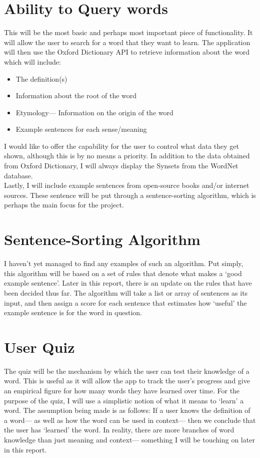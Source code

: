 \section{Ability to Query words}

This will be the most basic and perhaps most important piece of functionality. It will allow the user to search for a word that they want to learn. The application will then use the Oxford Dictionary API to retrieve information about the word which will include:
\begin{itemize}
    \item The definition(s)
    \item Information about the root of the word
    \item Etymology--- Information on the origin of the word
    \item Example sentences for each sense/meaning
\end{itemize}

I would like to offer the capability for the user to control what data they get shown, although this is by no means a priority. In addition to the data obtained from Oxford Dictionary, I will always display the Synsets from the WordNet\textsuperscript{\textregistered} database. 
\\
Lastly, I will include example sentences from open-source books and/or internet sources. These sentence will be put through a sentence-sorting algorithm, which is perhaps the main focus for the project. 

\section{Sentence-Sorting Algorithm}

I haven't yet managed to find any examples of such an algorithm. Put simply, this algorithm will be based on a set of rules that denote what makes a `good example sentence'. Later in this report, there is an update on the rules that have been decided thus far. The algorithm will take a list or array of sentences as its input, and then assign a score for each sentence that estimates how `useful' the example sentence is for the word in question. 

\section{User Quiz}

The quiz will be the mechanism by which the user can test their knowledge of a word. This is useful as it will allow the app to track the user's progress and give an empirical figure for how many words they have learned over time. For the purpose of the quiz, I will use a simplistic notion of what it means to `learn' a word. The assumption being made is as follows: If a user knows the definition of a word--- as well as how the word can be used in context--- then we conclude that the user has `learned' the word. In reality, there are more branches of word knowledge than just meaning and context--- something I will be touching on later in this report. \\

